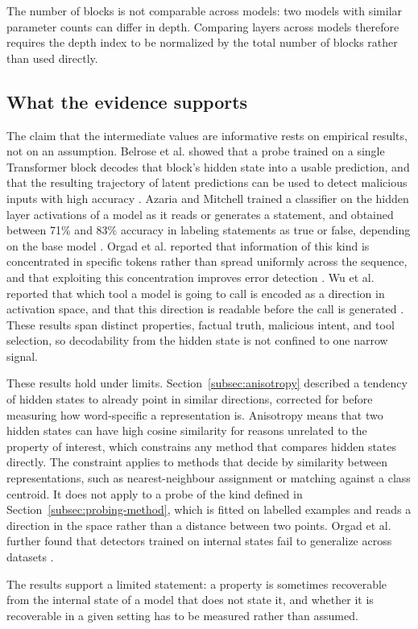 The number of blocks is not comparable across models: two models with similar parameter counts can differ in depth. Comparing layers across models therefore requires the depth index to be normalized by the total number of blocks rather than used directly.

\subsection{What the evidence supports}
\label{subsec:readability}

The claim that the intermediate values are informative rests on empirical results, not on an assumption. Belrose et al. showed that a probe trained on a single Transformer block decodes that block's hidden state into a usable prediction, and that the resulting trajectory of latent predictions can be used to detect malicious inputs with high accuracy \cite{belroseElicitingLatentPredictions2025}. Azaria and Mitchell trained a classifier on the hidden layer activations of a model as it reads or generates a statement, and obtained between 71\% and 83\% accuracy in labeling statements as true or false, depending on the base model \cite{azariaInternalStateLLM2023}. Orgad et al. reported that information of this kind is concentrated in specific tokens rather than spread uniformly across the sequence, and that exploiting this concentration improves error detection \cite{orgadLLMsKnowMore2025}. Wu et al. reported that which tool a model is going to call is encoded as a direction in activation space, and that this direction is readable before the call is generated \cite{wuToolCallingLinearly2026}. These results span distinct properties, factual truth, malicious intent, and tool selection, so decodability from the hidden state is not confined to one narrow signal.

These results hold under limits. Section~\ref{subsec:anisotropy} described a tendency of hidden states to already point in similar directions, corrected for before measuring how word-specific a representation is. Anisotropy means that two hidden states can have high cosine similarity for reasons unrelated to the property of interest, which constrains any method that compares hidden states directly. The constraint applies to methods that decide by similarity between representations, such as nearest-neighbour assignment or matching against a class centroid. It does not apply to a probe of the kind defined in Section~\ref{subsec:probing-method}, which is fitted on labelled examples and reads a direction in the space rather than a distance between two points. Orgad et al. further found that detectors trained on internal states fail to generalize across datasets \cite{orgadLLMsKnowMore2025}.

The results support a limited statement: a property is sometimes recoverable from the internal state of a model that does not state it, and whether it is recoverable in a given setting has to be measured rather than assumed.

